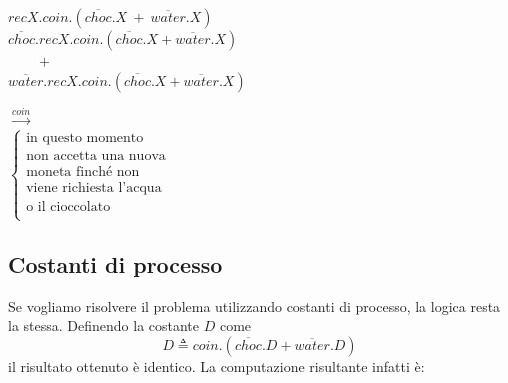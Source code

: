 		\begin{minipage}{0.55\linewidth}
			\begin{flushleft}
				\vspace{-4 mm}
				$recX.coin.(\overline{choc}.X\ + \ \overline{water}.X)$\\
				\vspace{20 mm}
				$\overline{choc}.recX.coin.(\overline{choc}.X + \overline{water}.X)$\\
				$\qquad +$\\
				$\overline{water}.recX.coin.(\overline{choc}.X + \overline{water}.X)$\\
			\end{flushleft}
		\end{minipage}
		\begin{minipage}{0.4\linewidth}
			\begin{flushright}
				\vspace{7 mm}
				$\xrightarrow{coin}$\\
				\vspace{9 mm}
				$\begin{cases}
					\text{in questo momento }\\
					\text{non accetta una nuova}\\
					\text{moneta finché non}\\
					\text{viene richiesta l'acqua}\\
					\text{o il cioccolato}\\
				\end{cases}$\\
			\end{flushright}
		\end{minipage}
		
		\subsection{Costanti di processo}
		
		Se vogliamo risolvere il problema utilizzando costanti di processo, la logica resta la stessa. Definendo la costante $D$ come
		$$D \triangleq coin.(\overline{choc}.D + \overline{water}.D)$$ il risultato ottenuto è identico. La computazione risultante infatti è:
		
